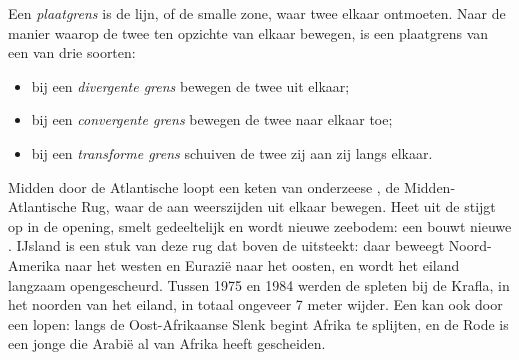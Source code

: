 \begin{definition}[Plaatgrens]\label{def:g7:plate-tectonics:plate-boundary}
Een \emph{plaatgrens} is de lijn, of de smalle zone,
waar twee  elkaar ontmoeten. Naar de manier waarop de twee 
ten opzichte van elkaar bewegen, is een plaatgrens van een van drie
soorten:
\begin{itemize}
  \item bij een \emph{divergente grens} bewegen de
        twee  uit elkaar;
  \item bij een \emph{convergente grens} bewegen de
        twee  naar elkaar toe;
  \item bij een \emph{transforme grens} schuiven de
        twee  zij aan zij langs elkaar.
\end{itemize}
\end{definition}

\begin{example}\label{ex:g7:plate-tectonics:divergent}
Midden door de Atlantische  loopt een keten van onderzeese ,
de Midden-Atlantische Rug, waar de  aan weerszijden uit elkaar
bewegen. Heet  uit de  stijgt op in de opening, smelt
gedeeltelijk en wordt nieuwe zeebodem: een  bouwt nieuwe
. IJsland is een stuk van deze rug dat boven de  uitsteekt: daar
beweegt Noord-Amerika naar het westen en Eurazië naar het oosten, en wordt
het eiland langzaam opengescheurd. Tussen 1975 en 1984 werden de spleten
bij de  Krafla, in het noorden van het eiland, in totaal ongeveer
7 meter wijder. Een  kan ook door een  lopen:
langs de Oost-Afrikaanse Slenk begint Afrika te splijten, en de Rode  is
een jonge  die Arabië al van Afrika heeft gescheiden.
\end{example}

